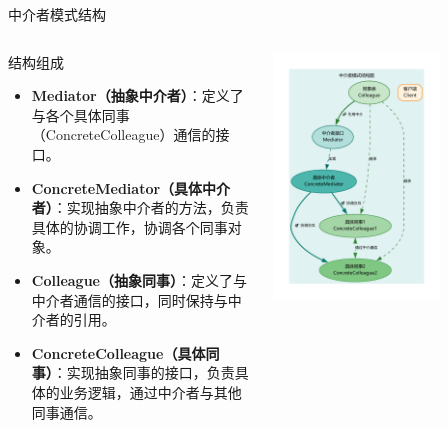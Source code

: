 \documentclass[UTF8,aspectratio=169]{beamer}
\begin{document}
\begin{frame}{中介者模式结构}
    \begin{columns}
        \begin{column}{0.48\textwidth}
            \begin{ytublock}{结构组成}
                \begin{itemize}
                    \item \textbf{Mediator（抽象中介者）}：定义了与各个具体同事（ConcreteColleague）通信的接口。
                    \item \textbf{ConcreteMediator（具体中介者）}：实现抽象中介者的方法，负责具体的协调工作，协调各个同事对象。
                    \item \textbf{Colleague（抽象同事）}：定义了与中介者通信的接口，同时保持与中介者的引用。
                    \item \textbf{ConcreteColleague（具体同事）}：实现抽象同事的接口，负责具体的业务逻辑，通过中介者与其他同事通信。
                \end{itemize}
            \end{ytublock}
        \end{column}
        \begin{column}{0.48\textwidth}
            \begin{center}
                \includegraphics[width=0.7\textwidth]{images/mediator_pattern.pdf}
            \end{center}
        \end{column}
    \end{columns}
\end{frame}
\end{document}
